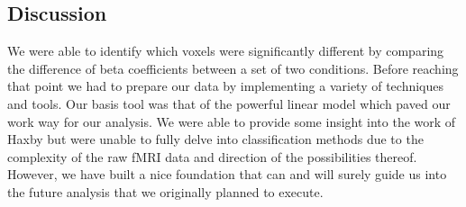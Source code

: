 \documentclass[12pt]{article}
\begin{document}
\subsection{Discussion}

We were able to identify which voxels were significantly different by comparing the difference of beta coefficients between a set of two conditions. Before reaching that point we had to prepare our data by implementing a variety of techniques and tools.  Our basis tool was that of the powerful linear model which paved our work way for our analysis. We were able to provide some insight into the work of Haxby but were unable to fully delve into classification methods due to the complexity of the raw fMRI data and direction of the possibilities thereof. However, we have built a nice foundation that can and will surely guide us into the future analysis that we originally planned to execute. 


\end{document}
